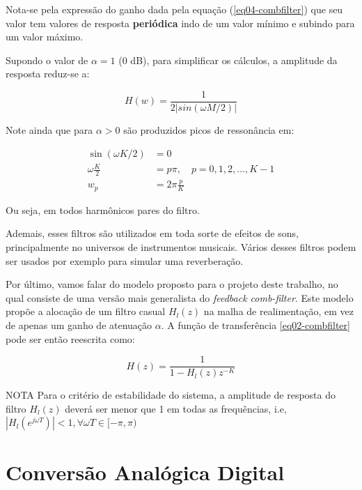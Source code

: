 		Nota-se pela expressão do ganho dada pela equação (\ref{eq04-combfilter}) que seu valor tem valores de resposta \textbf{periódica} indo de um valor mínimo e subindo para um valor máximo.
		
		Supondo o valor de $\alpha = 1$ ($0$ dB), para simplificar os cálculos, a amplitude da resposta reduz-se a:
		
		\begin{equation}
			\label{eq05-combfilter}
			H(w) = \frac{1}{2|sin(\omega M/2)|}
		\end{equation}

		Note ainda que para $\alpha > 0$ são produzidos picos de ressonância em:
		
		\begin{equation}
			\begin{aligned}
				\sin(\omega K/2) &= 0 \\
				\omega \frac{K}{2} &= p\pi,\quad p=0,1,2,...,K-1\\
				w_p &= 2\pi\frac{p}{K}
			\end{aligned}
		\end{equation}
		
		Ou seja, em todos harmônicos pares do filtro.
				
		Ademais, esses filtros são utilizados em toda sorte de efeitos de sons, principalmente no universos de instrumentos musicais. Vários desses filtros podem ser usados por exemplo para simular uma reverberação.
		
		Por último, vamos falar do modelo proposto para o projeto deste trabalho, no qual consiste de uma versão mais generalista do \textit{feedback comb-filter}. Este modelo propõe a alocação de um filtro casual $H_l(z)$ na malha de realimentação, em vez de apenas um ganho de atenuação $\alpha$. A função de transferência \ref{eq02-combfilter} pode ser então reescrita como:
		
		\begin{equation}
			H(z) = \frac{1}{1-H_l(z)z^{-K}}
		\end{equation}
		
		\begin{mymdframed}{NOTA}
			Para o critério de estabilidade do sistema, a amplitude de resposta do filtro $ H_l(z) $ deverá ser menor que 1 em todas as frequências, i.e, $ |H_l(e^{j\omega T})| < 1, \forall \omega T \in [-\pi,\pi)$
		\end{mymdframed}
		
		
\section{Conversão Analógica Digital}
\label{secao-conv-analogica-digital}	
